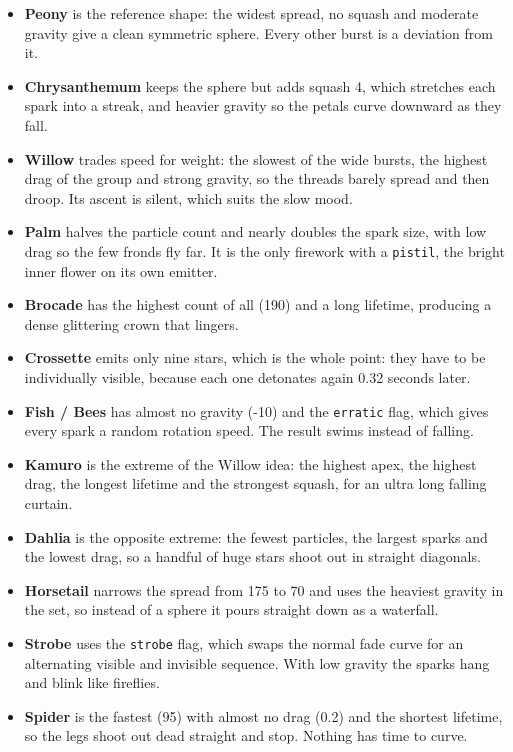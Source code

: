 \documentclass[12pt,letterpaper]{article}
\begin{document}
\begin{itemize}
  \item \textbf{Peony} is the reference shape: the widest spread, no squash and moderate gravity give a clean symmetric sphere. Every other burst is a deviation from it.
  \item \textbf{Chrysanthemum} keeps the sphere but adds squash 4, which stretches each spark into a streak, and heavier gravity so the petals curve downward as they fall.
  \item \textbf{Willow} trades speed for weight: the slowest of the wide bursts, the highest drag of the group and strong gravity, so the threads barely spread and then droop. Its ascent is silent, which suits the slow mood.
  \item \textbf{Palm} halves the particle count and nearly doubles the spark size, with low drag so the few fronds fly far. It is the only firework with a \texttt{pistil}, the bright inner flower on its own emitter.
  \item \textbf{Brocade} has the highest count of all (190) and a long lifetime, producing a dense glittering crown that lingers.
  \item \textbf{Crossette} emits only nine stars, which is the whole point: they have to be individually visible, because each one detonates again 0.32 seconds later.
  \item \textbf{Fish / Bees} has almost no gravity (-10) and the \texttt{erratic} flag, which gives every spark a random rotation speed. The result swims instead of falling.
  \item \textbf{Kamuro} is the extreme of the Willow idea: the highest apex, the highest drag, the longest lifetime and the strongest squash, for an ultra long falling curtain.
  \item \textbf{Dahlia} is the opposite extreme: the fewest particles, the largest sparks and the lowest drag, so a handful of huge stars shoot out in straight diagonals.
  \item \textbf{Horsetail} narrows the spread from 175 to 70 and uses the heaviest gravity in the set, so instead of a sphere it pours straight down as a waterfall.
  \item \textbf{Strobe} uses the \texttt{strobe} flag, which swaps the normal fade curve for an alternating visible and invisible sequence. With low gravity the sparks hang and blink like fireflies.
  \item \textbf{Spider} is the fastest (95) with almost no drag (0.2) and the shortest lifetime, so the legs shoot out dead straight and stop. Nothing has time to curve.

\end{itemize}
\end{document}

